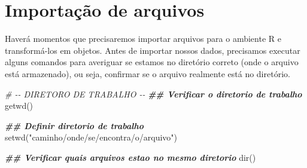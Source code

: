 \documentclass[
]{book}
\newenvironment{Shaded}{\begin{snugshade}}{\end{snugshade}}
\newcommand{\CommentTok}[1]{\textcolor[rgb]{0.56,0.35,0.01}{\textit{#1}}}
\newcommand{\DocumentationTok}[1]{\textcolor[rgb]{0.56,0.35,0.01}{\textbf{\textit{#1}}}}
\newcommand{\FunctionTok}[1]{\textcolor[rgb]{0.00,0.00,0.00}{#1}}
\newcommand{\NormalTok}[1]{#1}
\newcommand{\OtherTok}[1]{\textcolor[rgb]{0.56,0.35,0.01}{#1}}
\newcommand{\SpecialCharTok}[1]{\textcolor[rgb]{0.00,0.00,0.00}{#1}}
\newcommand{\StringTok}[1]{\textcolor[rgb]{0.31,0.60,0.02}{#1}}
\begin{document}
\begin{Shaded}
\end{Shaded}

\hypertarget{importauxe7uxe3o-de-arquivos}{%
\section{Importação de arquivos}\label{importauxe7uxe3o-de-arquivos}}

Haverá momentos que precisaremos importar arquivos para o ambiente R e transformá-los em objetos. Antes de importar nossos dados, precisamos executar alguns comandos para averiguar se estamos no diretório correto (onde o arquivo está armazenado), ou seja, confirmar se o arquivo realmente está no diretório.

\begin{Shaded}
\begin{Highlighting}[]
\CommentTok{\# {-}{-} DIRETORO DE TRABALHO {-}{-}}
\DocumentationTok{\#\# Verificar o diretorio de trabalho}
\FunctionTok{getwd}\NormalTok{()}

\DocumentationTok{\#\# Definir diretorio de trabalho}
\FunctionTok{setwd}\NormalTok{(}\StringTok{"caminho/onde/se/encontra/o/arquivo"}\NormalTok{)}

\DocumentationTok{\#\# Verificar quais arquivos estao no mesmo diretorio}
\FunctionTok{dir}\NormalTok{()}
\end{Highlighting}
\end{Shaded}
\end{document}
